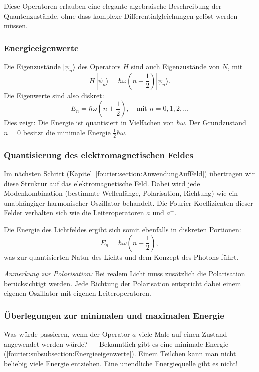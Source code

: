 			Diese Operatoren erlauben eine elegante algebraische Beschreibung der Quantenzustände, ohne dass komplexe Differentialgleichungen gelöst werden müssen.

		\subsubsection{Energieeigenwerte\label{fourier:subsubsection:Energieeigenwerte}}
			Die Eigenzustände $|\psi_n\rangle$ des Operators $H$ sind auch Eigenzustände von $N$, mit
			\begin{equation}
				H\,|\psi_n\rangle = \hbar\omega\left(n + \frac{1}{2}\right) |\psi_n\rangle.
			\end{equation}
			Die Eigenwerte sind also diskret:
			\[
				E_n = \hbar\omega\left(n + \frac{1}{2}\right), \quad \text{mit } n = 0,1,2,\dots
			\]
			Dies zeigt:
			Die Energie ist quantisiert in Vielfachen von $\hbar\omega$.
			Der Grundzustand $n = 0$ besitzt die minimale Energie $\tfrac{1}{2}\hbar\omega$.

		\subsubsection{Quantisierung des elektromagnetischen Feldes\label{fourier:subsubsection:QuantisierungElmagFeld}}
			Im nächsten Schritt (Kapitel~\ref{fourier:section:AnwendungAufFeld}) übertragen wir diese Struktur auf das elektromagnetische Feld.
			Dabei wird jede Modenkombination (bestimmte Wellenlänge, Polarisation, Richtung) wie ein unabhängiger harmonischer Oszillator behandelt.
			Die Fourier-Koeffizienten dieser Felder verhalten sich wie die Leiteroperatoren $a$ und $a^+$.

			Die Energie des Lichtfeldes ergibt sich somit ebenfalls in diskreten Portionen:
			\[
				E_n = \hbar\omega\left(n + \frac{1}{2}\right),
			\]
			was zur quantisierten Natur des Lichts und dem Konzept des Photons führt.

			\textit{Anmerkung zur Polarisation:} Bei realem Licht muss zusätzlich die Polarisation berücksichtigt werden.
			Jede Richtung der Polarisation entspricht dabei einem eigenen Oszillator mit eigenen Leiteroperatoren.

		\subsubsection{Überlegungen zur minimalen und maximalen Energie\label{fourier:subsubsection:MinMaxEnergie}}
			Was würde passieren, wenn der Operator $a$ viele Male auf einen Zustand angewendet werden würde? ---
			Bekanntlich gibt es eine minimale Energie (\ref{fourier:subsubsection:Energieeigenwerte}).
			Einem Teilchen kann man nicht beliebig viele Energie entziehen.
			Eine unendliche Energiequelle gibt es nicht!

